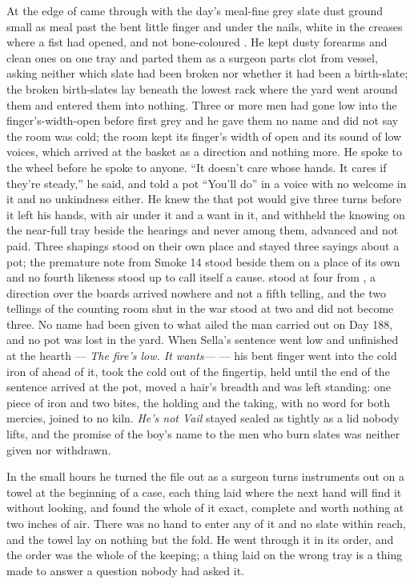 At the edge of   came through with the day's meal-fine grey slate dust ground small as meal past the bent little finger and under the nails, white in the creases where a fist had opened, and not bone-coloured . He kept dusty forearms and clean ones on one tray and parted them as a surgeon parts clot from vessel, asking neither which slate had been broken nor whether it had been a birth-slate; the broken birth-slates lay beneath the lowest rack where the yard went around them and entered them into nothing. Three or more men had gone low into the finger's-width-open  before first grey and he gave them no name and did not say the room was cold; the room kept its finger's width of open and its sound of low voices, which arrived at the basket as a direction and nothing more. He spoke to the wheel before he spoke to anyone. “It doesn't care whose hands. It cares if they're steady,” he said, and told a pot “You'll do” in a voice with no welcome in it and no unkindness either. He knew the  that pot would give three turns before it left his hands, with air under it and a want in it, and withheld the knowing on the near-full tray beside the hearings and never among them, advanced and not paid. Three shapings stood on their own place and stayed three sayings about a pot; the premature note from Smoke 14 stood beside them on a place of its own and no fourth likeness stood up to call itself a cause.  stood at four from , a direction over the boards arrived nowhere and not a fifth telling, and the two tellings of the counting room shut in the war stood at two and did not become three. No name had been given to what ailed the man carried out on Day 188, and no pot was lost in the yard. When Sella's sentence went low and unfinished at the hearth --- \emph{The fire's low. It wants---} --- his bent finger went into the cold iron of  ahead of it, took the cold out of the fingertip, held until the end of the sentence arrived at the pot, moved a hair's breadth and was left standing: one piece of iron and two bites, the holding and the taking, with no  word for both mercies, joined to no kiln. \emph{He's not Vail} stayed sealed as tightly as a lid nobody lifts, and the promise of the boy's name to the men who burn slates was neither given nor withdrawn.

\scenebreak

In the small hours he turned the file out as a surgeon turns instruments out on a towel at the beginning of a case, each thing laid where the next hand will find it without looking, and found the whole of it exact, complete and worth nothing at two inches of air. There was no hand to enter any of it and no slate within reach, and the towel lay on nothing but the fold. He went through it in its order, and the order was the whole of the keeping; a thing laid on the wrong tray is a thing made to answer a question nobody had asked it.


